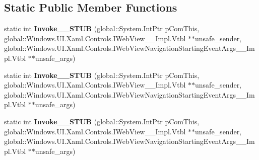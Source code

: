 \subsection*{Static Public Member Functions}
\begin{DoxyCompactItemize}
\item 
\mbox{\label{struct_windows_1_1_foundation_1_1_typed_event_handler___a___windows___u_i___xaml___controls___we35912db850c22c9b2be1a07564605cd2_a2b5b6141258b864cbaa459d76cee888c}} 
static int {\bfseries Invoke\+\_\+\+\_\+\+S\+T\+UB} (global\+::\+System.\+Int\+Ptr p\+Com\+This, global\+::\+Windows.\+U\+I.\+Xaml.\+Controls.\+I\+Web\+View\+\_\+\+\_\+\+Impl.\+Vtbl $\ast$$\ast$unsafe\+\_\+sender, global\+::\+Windows.\+U\+I.\+Xaml.\+Controls.\+I\+Web\+View\+Navigation\+Starting\+Event\+Args\+\_\+\+\_\+\+Impl.\+Vtbl $\ast$$\ast$unsafe\+\_\+args)
\item 
\mbox{\label{struct_windows_1_1_foundation_1_1_typed_event_handler___a___windows___u_i___xaml___controls___we35912db850c22c9b2be1a07564605cd2_a2b5b6141258b864cbaa459d76cee888c}} 
static int {\bfseries Invoke\+\_\+\+\_\+\+S\+T\+UB} (global\+::\+System.\+Int\+Ptr p\+Com\+This, global\+::\+Windows.\+U\+I.\+Xaml.\+Controls.\+I\+Web\+View\+\_\+\+\_\+\+Impl.\+Vtbl $\ast$$\ast$unsafe\+\_\+sender, global\+::\+Windows.\+U\+I.\+Xaml.\+Controls.\+I\+Web\+View\+Navigation\+Starting\+Event\+Args\+\_\+\+\_\+\+Impl.\+Vtbl $\ast$$\ast$unsafe\+\_\+args)
\item 
\mbox{\label{struct_windows_1_1_foundation_1_1_typed_event_handler___a___windows___u_i___xaml___controls___we35912db850c22c9b2be1a07564605cd2_a2b5b6141258b864cbaa459d76cee888c}} 
static int {\bfseries Invoke\+\_\+\+\_\+\+S\+T\+UB} (global\+::\+System.\+Int\+Ptr p\+Com\+This, global\+::\+Windows.\+U\+I.\+Xaml.\+Controls.\+I\+Web\+View\+\_\+\+\_\+\+Impl.\+Vtbl $\ast$$\ast$unsafe\+\_\+sender, global\+::\+Windows.\+U\+I.\+Xaml.\+Controls.\+I\+Web\+View\+Navigation\+Starting\+Event\+Args\+\_\+\+\_\+\+Impl.\+Vtbl $\ast$$\ast$unsafe\+\_\+args)
\item 

\end{DoxyCompactItemize}
